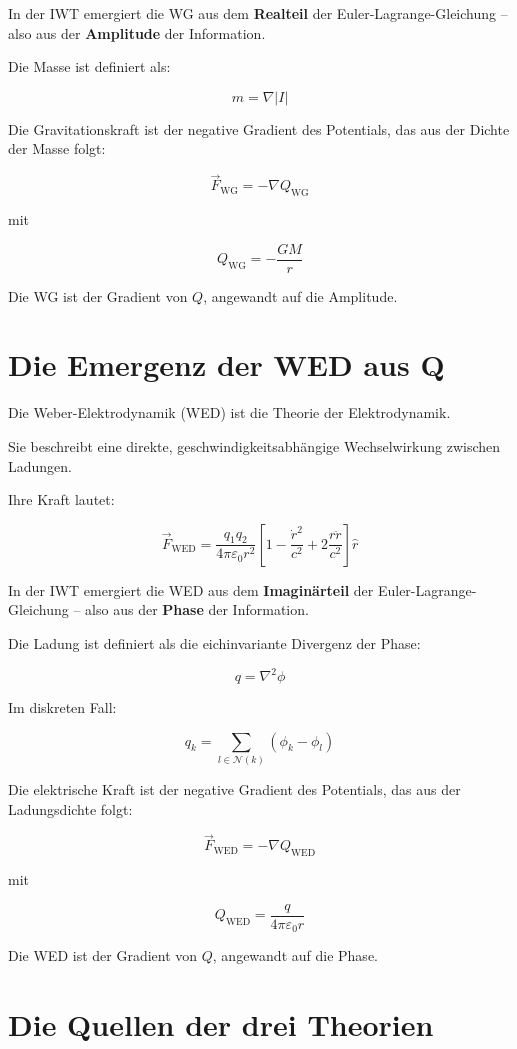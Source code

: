 In der IWT emergiert die WG aus dem \textbf{Realteil} der Euler-Lagrange-Gleichung – also aus der \textbf{Amplitude} der Information.

Die Masse ist definiert als:

\[
m = \nabla |I|
\]

Die Gravitationskraft ist der negative Gradient des Potentials, das aus der Dichte der Masse folgt:

\[
\vec{F}_{\text{WG}} = -\nabla Q_{\text{WG}}
\]

mit

\[
Q_{\text{WG}} = -\frac{GM}{r}
\]

Die WG ist der Gradient von \( Q \), angewandt auf die Amplitude.

\section{Die Emergenz der WED aus Q}

Die Weber-Elektrodynamik (WED) ist die Theorie der Elektrodynamik.

Sie beschreibt eine direkte, geschwindigkeitsabhängige Wechselwirkung zwischen Ladungen.

Ihre Kraft lautet:

\[
\vec{F}_{\text{WED}} = \frac{q_1 q_2}{4\pi \varepsilon_0 r^2} \left[ 1 - \frac{\dot{r}^2}{c^2} + 2 \frac{r\ddot{r}}{c^2} \right] \hat{r}
\]

In der IWT emergiert die WED aus dem \textbf{Imaginärteil} der Euler-Lagrange-Gleichung – also aus der \textbf{Phase} der Information.

Die Ladung ist definiert als die eichinvariante Divergenz der Phase:

\[
q = \nabla^2 \phi
\]

Im diskreten Fall:

\[
q_k = \sum_{l \in \mathcal{N}(k)} (\phi_k - \phi_l)
\]

Die elektrische Kraft ist der negative Gradient des Potentials, das aus der Ladungsdichte folgt:

\[
\vec{F}_{\text{WED}} = -\nabla Q_{\text{WED}}
\]

mit

\[
Q_{\text{WED}} = \frac{q}{4\pi \varepsilon_0 r}
\]

Die WED ist der Gradient von \( Q \), angewandt auf die Phase.

\section{Die Quellen der drei Theorien}

